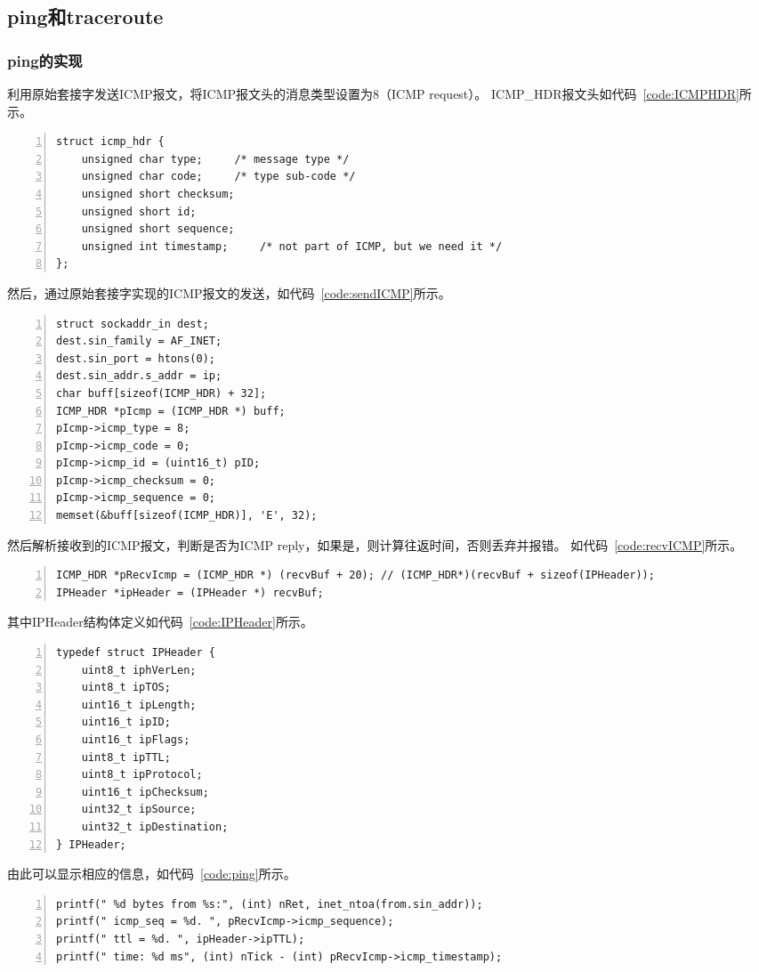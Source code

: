 \documentclass[a4paper,twoside]{ctexrep}
\begin{document}
\begin{spacing}{1.2}
\subsection{ping和traceroute}

\subsubsection{ping的实现}

利用原始套接字发送ICMP报文，将ICMP报文头的消息类型设置为8（ICMP request）。
ICMP\_HDR报文头如代码~\ref{code:ICMPHDR}所示。

\begin{lstlisting}[numbers=left,style=CppStyle,caption={ICMP\_HDR结构体定义},label={code:ICMPHDR}]
struct icmp_hdr {
	unsigned char type;		/* message type */
	unsigned char code;		/* type sub-code */
	unsigned short checksum;
	unsigned short id;
	unsigned short sequence;
	unsigned int timestamp;		/* not part of ICMP, but we need it */
};
\end{lstlisting}

然后，通过原始套接字实现的ICMP报文的发送，如代码~\ref{code:sendICMP}所示。

\begin{lstlisting}[numbers=left,style=CppStyle,caption={ICMP报文发送函数},label={code:sendICMP}]
struct sockaddr_in dest;
dest.sin_family = AF_INET;
dest.sin_port = htons(0);
dest.sin_addr.s_addr = ip;
char buff[sizeof(ICMP_HDR) + 32];
ICMP_HDR *pIcmp = (ICMP_HDR *) buff;
pIcmp->icmp_type = 8; 
pIcmp->icmp_code = 0;
pIcmp->icmp_id = (uint16_t) pID;
pIcmp->icmp_checksum = 0;
pIcmp->icmp_sequence = 0;
memset(&buff[sizeof(ICMP_HDR)], 'E', 32);
\end{lstlisting}

然后解析接收到的ICMP报文，判断是否为ICMP reply，如果是，则计算往返时间，否则丢弃并报错。
如代码~\ref{code:recvICMP}所示。
\begin{lstlisting}[numbers=left,style=CppStyle,caption={ICMP报文接收函数},label={code:recvICMP}]
ICMP_HDR *pRecvIcmp = (ICMP_HDR *) (recvBuf + 20); // (ICMP_HDR*)(recvBuf + sizeof(IPHeader));
IPHeader *ipHeader = (IPHeader *) recvBuf;
\end{lstlisting}
其中IPHeader结构体定义如代码~\ref{code:IPHeader}所示。
\begin{lstlisting}[numbers=left,style=CppStyle,caption={IPHeader结构体定义},label={code:IPHeader}]
	typedef struct IPHeader {
    uint8_t iphVerLen; 
    uint8_t ipTOS; 
    uint16_t ipLength; 
    uint16_t ipID; 
    uint16_t ipFlags; 
    uint8_t ipTTL; 
    uint8_t ipProtocol;
    uint16_t ipChecksum;
    uint32_t ipSource; 
    uint32_t ipDestination; 
} IPHeader;
\end{lstlisting}
由此可以显示相应的信息，如代码~\ref{code:ping}所示。
\begin{lstlisting}[numbers=left,style=CppStyle,caption={ping显示信息},label={code:ping}]
printf(" %d bytes from %s:", (int) nRet, inet_ntoa(from.sin_addr));
printf(" icmp_seq = %d. ", pRecvIcmp->icmp_sequence);
printf(" ttl = %d. ", ipHeader->ipTTL);
printf(" time: %d ms", (int) nTick - (int) pRecvIcmp->icmp_timestamp);
\end{lstlisting}


\end{spacing}
\end{document}
